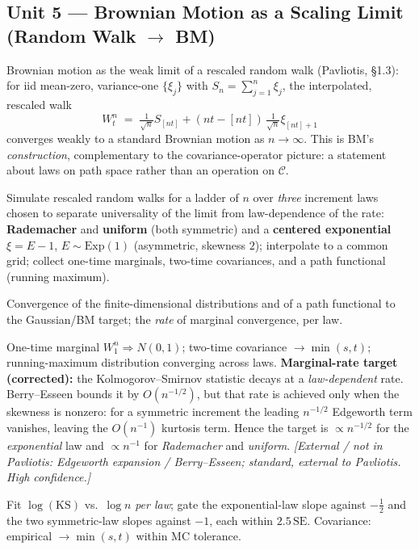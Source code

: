\documentclass[11pt]{article}
\newcommand{\extnote}[1]{{\small\color{extgray}\emph{[External / not in Pavliotis: #1]}}}
\newcommand{\pav}[1]{{\small\color{hubblue}(Pavliotis, #1)}}
\newenvironment{unitmeta}{%
  \begin{description}[style=sameline,leftmargin=1.4cm,font=\bfseries\color{hubblue}]
}{%
  \end{description}
}
\begin{document}
\subsection*{Unit 5 --- Brownian Motion as a Scaling Limit (Random Walk $\to$ BM)}
\begin{unitmeta}
\item[Concept] Brownian motion as the weak limit of a rescaled random walk \pav{\S1.3}: for iid mean-zero, variance-one $\{\xi_j\}$ with $S_n=\sum_{j=1}^n\xi_j$, the interpolated, rescaled walk
\[
W^n_t \;=\; \tfrac{1}{\sqrt{n}}S_{[nt]} + (nt-[nt])\,\tfrac{1}{\sqrt{n}}\xi_{[nt]+1}
\]
converges weakly to a standard Brownian motion as $n\to\infty$. This is BM's \emph{construction}, complementary to the covariance-operator picture: a statement about laws on path space rather than an operation on $\mathcal{C}$.
\item[Build] Simulate rescaled random walks for a ladder of $n$ over \emph{three} increment laws chosen to separate universality of the limit from law-dependence of the rate: \textbf{Rademacher} and \textbf{uniform} (both symmetric) and a \textbf{centered exponential} $\xi = E-1$, $E\sim\mathrm{Exp}(1)$ (asymmetric, skewness $2$); interpolate to a common grid; collect one-time marginals, two-time covariances, and a path functional (running maximum).
\item[Check] Convergence of the finite-dimensional distributions and of a path functional to the Gaussian/BM target; the \emph{rate} of marginal convergence, per law.
\item[Analytic target] One-time marginal $W^n_1 \Rightarrow N(0,1)$; two-time covariance $\to\min(s,t)$; running-maximum distribution converging across laws. \textbf{Marginal-rate target (corrected):} the Kolmogorov--Smirnov statistic decays at a \emph{law-dependent} rate. Berry--Esseen bounds it by $O(n^{-1/2})$, but that rate is achieved only when the skewness is nonzero: for a symmetric increment the leading $n^{-1/2}$ Edgeworth term vanishes, leaving the $O(n^{-1})$ kurtosis term. Hence the target is $\propto n^{-1/2}$ for the \emph{exponential} law and $\propto n^{-1}$ for \emph{Rademacher} and \emph{uniform}. \extnote{Edgeworth expansion / Berry--Esseen; standard, external to Pavliotis. High confidence.}
\item[Pass/fail] Fit $\log(\text{KS})$ vs.\ $\log n$ \emph{per law}; gate the exponential-law slope against $-\tfrac12$ and the two symmetric-law slopes against $-1$, each within $2.5\,\mathrm{SE}$. Covariance: empirical $\to\min(s,t)$ within MC tolerance.

\end{unitmeta}
\end{document}
